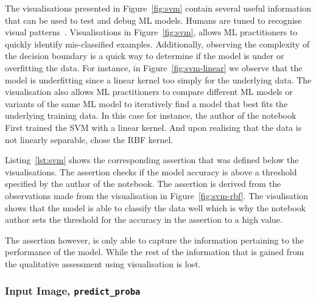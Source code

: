 \documentclass[conference]{IEEEtran}
\begin{document}
The visualisations presented in Figure~\ref{fig:svm} contain several useful information that can be used to test and debug ML models. Humans are tuned to recognise visual patterns~\cite{CITEME}. Visualisations in Figure~\ref{fig:svm}, allows ML practitioners to quickly identify mis-classified examples. Additionally, observing the complexity of the decision boundary is a quick way to determine if the model is under or overfitting the data. For instance, in Figure~\ref{fig:svm-linear} we observe that the model is underfitting since a linear kernel too simply for the underlying data. The visualisation also allows ML practitioners to compare different ML models or variants of the same ML model to iteratively find a model that best fits the underlying training data. In this case for instance, the author of the notebook First trained the SVM with a linear kernel. And upon realising that the data is not linearly separable, chose the RBF kernel.

Listing~\ref{lst:svm} shows the corresponding assertion that was defined below the visualisations. The assertion checks if the model accuracy is above a threshold specified by the author of the notebook. The assertion is derived from the observations made from the visualisation in Figure~\ref{fig:svm-rbf}. The visulisation shows that the model is able to classify the data well which is why the notebook author sets the threshold for the accuracy in the assertion to a high value.

The assertion however, is only able to capture the information pertaining to the performance of the model. While the rest of the information that is gained from the qualitative assessment using visualisation is lost.

\subsubsection{Input Image, \texttt{predict\_proba}}
\end{document}

